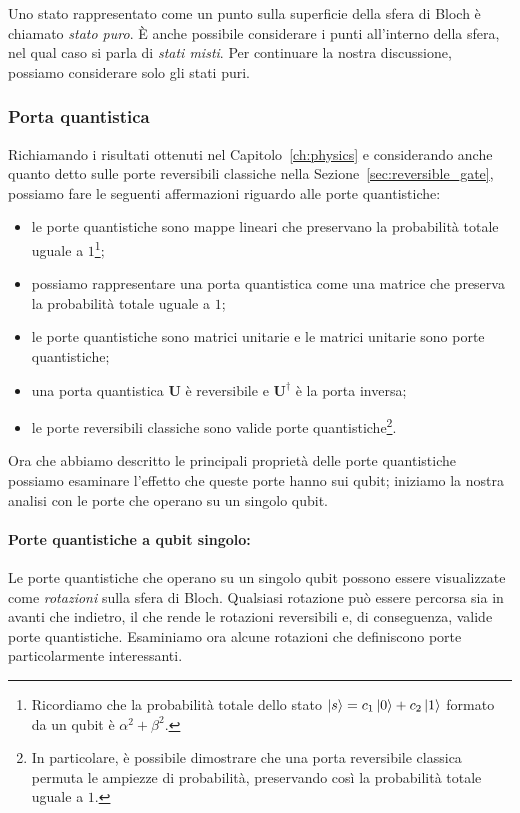 Uno stato rappresentato come un punto sulla superficie della sfera di Bloch è chiamato \emph{stato puro}. È anche possibile considerare i punti all'interno della sfera, nel qual caso si parla di \emph{stati misti}. Per continuare la nostra discussione, possiamo considerare solo gli stati puri.
\subsubsection*{Porta quantistica}
\label{sec:quantum_gate}
Richiamando i risultati ottenuti nel Capitolo~\ref{ch:physics} e considerando anche quanto detto sulle porte reversibili classiche nella Sezione~\ref{sec:reversible_gate}, possiamo fare le seguenti affermazioni riguardo alle porte quantistiche:
\begin{itemize}
	\item le porte quantistiche sono mappe lineari che preservano la probabilità totale uguale a $1$\footnote{Ricordiamo che la probabilità totale dello stato $\Ket{s} = c_1 \Ket{0} + c_2  \Ket{1}$ formato da un qubit è $\alpha^2 + \beta^2$.};
	\item possiamo rappresentare una porta quantistica come una matrice che preserva la probabilità totale uguale a $1$;
	\item le porte quantistiche sono matrici unitarie e le matrici unitarie sono porte quantistiche;
	\item una porta quantistica $\mathbf{U}$ è reversibile e $\mathbf{U}^\dagger$ è la porta inversa;
	\item le porte reversibili classiche sono valide porte quantistiche\footnote{In particolare, è possibile dimostrare che una porta reversibile classica permuta le ampiezze di probabilità, preservando così la probabilità totale uguale a $1$.}.
\end{itemize}

Ora che abbiamo descritto le principali proprietà delle porte quantistiche possiamo esaminare l'effetto che queste porte hanno sui qubit; iniziamo la nostra analisi con le porte che operano su un singolo qubit.
\paragraph{Porte quantistiche a qubit singolo:}\label{par:single_gate} Le porte quantistiche che operano su un singolo qubit possono essere visualizzate come \emph{rotazioni} sulla sfera di Bloch. Qualsiasi rotazione può essere percorsa sia in avanti che indietro, il che rende le rotazioni reversibili e, di conseguenza, valide porte quantistiche. Esaminiamo ora alcune rotazioni che definiscono porte particolarmente interessanti.

